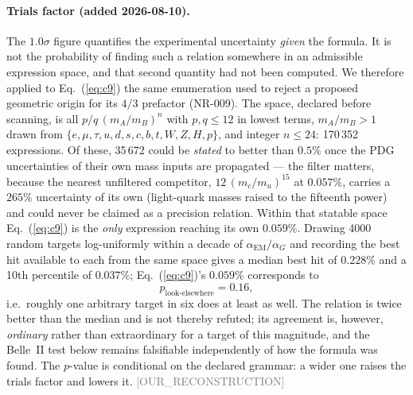 \documentclass[twocolumn,prd,amsmath,amssymb,floatfix]{revtex4-2}
\newcommand{\reconstruction}{\textcolor{gray}{\small[OUR\_RECONSTRUCTION]}}
\begin{document}
\paragraph{Trials factor (added 2026-08-10).}
The $1.0\sigma$ figure quantifies the experimental uncertainty \emph{given} the
formula.  It is not the probability of finding such a relation somewhere in an
admissible expression space, and that second quantity had not been computed.
We therefore applied to Eq.~(\ref{eq:c9}) the same enumeration used to reject a
proposed geometric origin for its $4/3$ prefactor (NR-009).
The space, declared before scanning, is all
$p/q\,(m_A/m_B)^n$ with $p,q \le 12$ in lowest terms, $m_A/m_B > 1$ drawn from
$\{e,\mu,\tau,u,d,s,c,b,t,W,Z,H,p\}$, and integer $n \le 24$: 170\,352
expressions.
Of these, 35\,672 could be \emph{stated} to better than $0.5\%$ once the PDG
uncertainties of their own mass inputs are propagated --- the filter matters,
because the nearest unfiltered competitor,
$12\,(m_c/m_u)^{15}$ at $0.057\%$, carries a $265\%$ uncertainty of its own
(light-quark masses raised to the fifteenth power) and could never be claimed as
a precision relation.
Within that statable space Eq.~(\ref{eq:c9}) is the \emph{only} expression
reaching its own $0.059\%$.
Drawing 4000 random targets log-uniformly within a decade of
$\alpha_\mathrm{EM}/\alpha_G$ and recording the best hit available to each from
the same space gives a median best hit of $0.228\%$ and a 10th percentile of
$0.037\%$; Eq.~(\ref{eq:c9})'s $0.059\%$ corresponds to
\begin{equation}
  p_\mathrm{look\text{-}elsewhere} = 0.16 ,
\end{equation}
i.e.\ roughly one arbitrary target in six does at least as well.
The relation is twice better than the median and is not thereby refuted; its
agreement is, however, \emph{ordinary} rather than extraordinary for a target of
this magnitude, and the Belle~II test below remains falsifiable independently of
how the formula was found.
The $p$-value is conditional on the declared grammar: a wider one raises the
trials factor and lowers it.
\reconstruction
\end{document}
